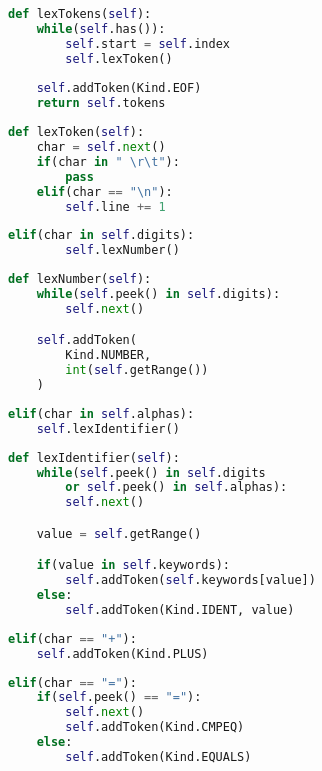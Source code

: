\documentclass{beamer}
\begin{document}
    
    \begin{frame}[fragile]
        \begin{lstlisting}[language=Python]
def lexTokens(self):
    while(self.has()):
        self.start = self.index
        self.lexToken()
    
    self.addToken(Kind.EOF)
    return self.tokens
        \end{lstlisting}
    \end{frame}

    \begin{frame}[fragile]
    \begin{lstlisting}[language=Python]
def lexToken(self):
    char = self.next()
    if(char in " \r\t"):
        pass
    elif(char == "\n"):
        self.line += 1
    \end{lstlisting}
    \end{frame}

    \begin{frame}[fragile]
    \begin{lstlisting}[language=Python]
    elif(char in self.digits):
        self.lexNumber()
    \end{lstlisting}
    \begin{lstlisting}[language=Python]
def lexNumber(self):
    while(self.peek() in self.digits):
        self.next()

    self.addToken(
        Kind.NUMBER,
        int(self.getRange())
    )
    \end{lstlisting}
    \end{frame}

    \begin{frame}[fragile]
    \begin{lstlisting}[language=Python]
elif(char in self.alphas):
    self.lexIdentifier()
    \end{lstlisting}
    \begin{lstlisting}[language=Python]
def lexIdentifier(self):
    while(self.peek() in self.digits
        or self.peek() in self.alphas):
        self.next()

    value = self.getRange()

    if(value in self.keywords):
        self.addToken(self.keywords[value])
    else:
        self.addToken(Kind.IDENT, value)
    \end{lstlisting}
    \end{frame}

    \begin{frame}[fragile]
    \begin{lstlisting}[language=Python]
elif(char == "+"):
    self.addToken(Kind.PLUS)
    \end{lstlisting}
    \begin{lstlisting}[language=Python]
elif(char == "="):
    if(self.peek() == "="):
        self.next()
        self.addToken(Kind.CMPEQ)
    else:
        self.addToken(Kind.EQUALS)
    \end{lstlisting}
    \end{frame}
\end{document}
